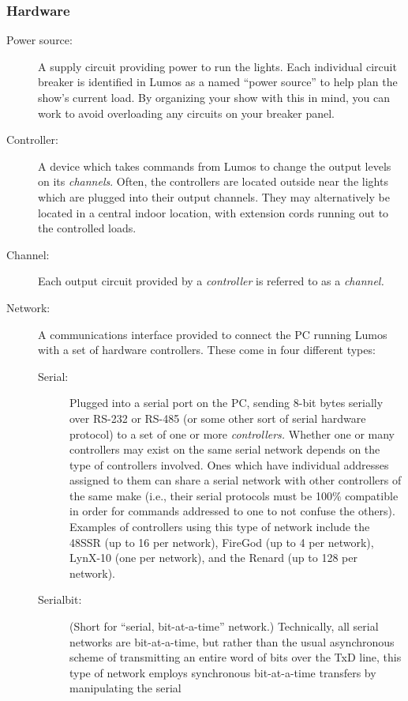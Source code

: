 \documentclass{article}
\begin{document}
\subsubsection{Hardware}
\begin{description}
	\item[Power source:]
 		A supply circuit providing power to run the lights.  Each individual
		circuit breaker is identified in Lumos as a named ``power source''
		to help plan the show's current load.  By organizing your show with
		this in mind, you can work to avoid overloading any circuits on
		your breaker panel.
	\item[Controller:]
		A device which takes commands from Lumos to change the output levels
		on its {\em channels\/}.  Often, the controllers are located outside
		near the lights which are plugged into their output channels.  They
		may alternatively be located in a central indoor location, with
		extension cords running out to the controlled loads.
	\item[Channel:]
		Each output circuit provided by a {\em controller\/} is referred to
		as a {\em channel.\/}
	\item[Network:]
		A communications interface provided to connect the PC running Lumos
		with a set of hardware controllers.  These come in four different
		types:
		\begin{description}
			\item[Serial:]
				Plugged into a serial port on the PC, sending 8-bit bytes
				serially over RS-232 or RS-485 (or some other sort of serial
				hardware protocol) to a set of one or more {\em
				controllers.\/}  Whether one or many controllers may exist
				on the same serial network depends on the type of controllers
				involved.  Ones which have individual addresses assigned to
				them can share a serial network with other controllers of the
				same make (i.e., their serial protocols must be 100\%
				compatible in order for commands addressed to one to not
				confuse the others).  
				Examples of controllers using this type of network include the
				48SSR (up to 16 per network), 
				FireGod (up to 4 per network), 
				LynX-10 (one per network),
				and the 
				Renard (up to 128 per network).
			\item[Serialbit:]
				(Short for ``serial, bit-at-a-time'' network.)  Technically, 
				all serial networks are bit-at-a-time, but rather than the
				usual asynchronous scheme of transmitting an entire word of
				bits over the TxD line, this type of network employs
				synchronous bit-at-a-time transfers by manipulating the serial

\end{description}
\end{description}
\end{document}
